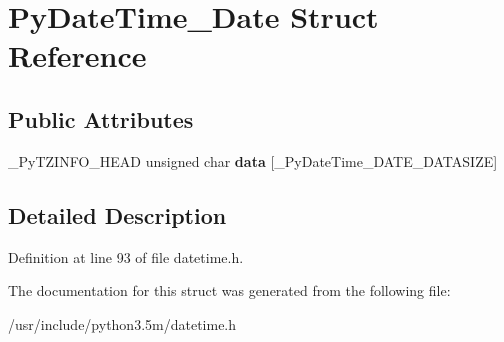 \hypertarget{structPyDateTime__Date}{}\section{Py\+Date\+Time\+\_\+\+Date Struct Reference}
\label{structPyDateTime__Date}
\subsection*{Public Attributes}
\begin{DoxyCompactItemize}
\item 
\+\_\+\+Py\+T\+Z\+I\+N\+F\+O\+\_\+\+H\+E\+AD unsigned char {\bfseries data} \mbox{[}\+\_\+\+Py\+Date\+Time\+\_\+\+D\+A\+T\+E\+\_\+\+D\+A\+T\+A\+S\+I\+ZE\mbox{]}\hypertarget{structPyDateTime__Date_ab9c69c1645e8c6db8fd199110bb95b66}{}\label{structPyDateTime__Date_ab9c69c1645e8c6db8fd199110bb95b66}

\end{DoxyCompactItemize}


\subsection{Detailed Description}


Definition at line 93 of file datetime.\+h.



The documentation for this struct was generated from the following file\+:\begin{DoxyCompactItemize}
\item 
/usr/include/python3.\+5m/datetime.\+h\end{DoxyCompactItemize}
